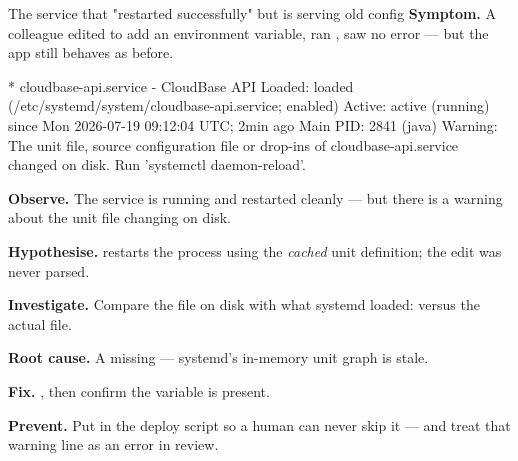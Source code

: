 \begin{debuglab}{The service that "restarted successfully" but is serving old config}
\textbf{Symptom.} A colleague edited  to add an environment variable, ran , saw no error --- but the app still behaves as before.

\begin{outbox}
* cloudbase-api.service - CloudBase API
     Loaded: loaded (/etc/systemd/system/cloudbase-api.service; enabled)
     Active: active (running) since Mon 2026-07-19 09:12:04 UTC; 2min ago
   Main PID: 2841 (java)
Warning: The unit file, source configuration file or drop-ins of
cloudbase-api.service changed on disk. Run 'systemctl daemon-reload'.
\end{outbox}

\begin{tickcheck}
  \item \textbf{Observe.} The service is running and restarted cleanly --- but there is a warning about the unit file changing on disk.
  \item \textbf{Hypothesise.}  restarts the process using the \emph{cached} unit definition; the edit was never parsed.
  \item \textbf{Investigate.} Compare the file on disk with what systemd loaded:  versus the actual file.
  \item \textbf{Root cause.} A missing  --- systemd's in-memory unit graph is stale.
  \item \textbf{Fix.} , then confirm the variable is present.
  \item \textbf{Prevent.} Put  in the deploy script so a human can never skip it --- and treat that warning line as an error in review.
\end{tickcheck}
\end{debuglab}

